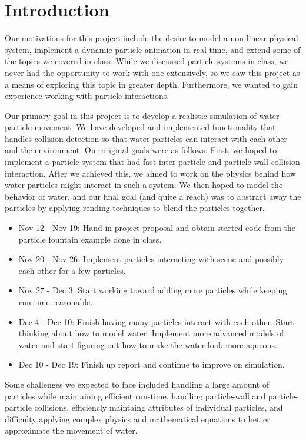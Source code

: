 \section{Introduction}

Our motivations for this project include the desire to model a non-linear physical system,
implement a dynamic particle animation in real time, and extend some of the topics we covered in class.
While we discussed particle systems in class, we never had the opportunity to work with one extensively,
so we saw this project as a means of exploring this topic in greater depth. Furthermore, we wanted to gain experience working with particle interactions.

Our primary goal in this project is to develop a realistic simulation of water particle movement.
We have developed and implemented functionality that handles collision detection so that water
particles can interact with each other and the environment. Our original goals were as follows.  First, we hoped to implement a particle system that had fast inter-particle and particle-wall collision interaction. After we achieved this, we aimed to work on the physics behind how water particles might interact in such a system. We then hoped to model the behavior of water, and our final goal (and quite a reach) was to abstract away the particles by applying rending techniques to blend the particles together.\\ 

\begin{itemize}
  \item Nov 12 - Nov 19: Hand in project proposal and obtain started code from the particle fountain example done in class.
  \item Nov 20 - Nov 26: Implement particles interacting with scene and possibly each other for
  a few particles.
  \item Nov 27 - Dec 3: Start working toward adding more particles while keeping run time reasonable.
  \item Dec 4 - Dec 10: Finish having many particles interact with each other. Start thinking about
  how to model water. Implement more advanced models of water and start figuring out how to make
  the water look more aqueous.
  \item Dec 10 - Dec 19: Finish up report and continue to improve on simulation.
\end{itemize}

Some challenges we expected to face included handling a large amount of particles while maintaining
efficient run-time, handling particle-wall and particle-particle collisions, efficiencly maintaing attributes of individual particles, and difficulty applying complex physics and mathematical equations to better approximate the movement of water. 

